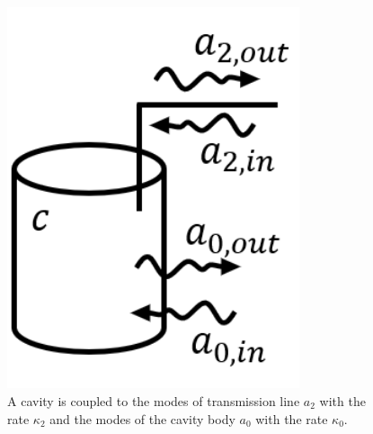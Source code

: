 \begin{figure}[htbp]
    \centering
    \includegraphics[width=8.6cm]{figures/inout.png}
    \caption{A cavity is coupled to the modes of transmission line $a_2$ with 
the rate $\kappa_2$ and the modes of the cavity body $a_0$ with the rate 
$\kappa_0$.}
    \label{fig:cavity_in_out}
\end{figure}



